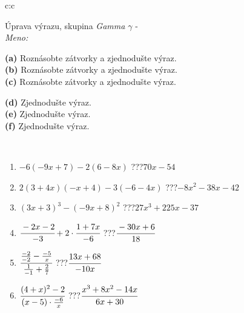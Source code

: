 \documentclass[10pt]{report}
\begin{document}
\newpage
\thispagestyle{empty}
\begin{tabular}{c:c}
\begin{minipage}[c][104.5mm][t]{0.5\linewidth}
\begin{center}
\vspace{7mm}
{\huge Úprava výrazu, skupina \textit{Gamma $\gamma$} -}\\[5mm]
\textit{Meno:}\phantom{xxxxxxxxxxxxxxxxxxxxxxxxxxxxxxxxxxxxxxxxxxxxxxxxxxxxxxxxxxxxxxxxx}\\[5mm]
\begin{minipage}{0.95\linewidth}
\begin{center}
{\small \begin{minipage}{0.6\textwidth}
\textbf{(a)} Roznásobte zátvorky a zjednodušte výraz. \\[1mm]
\textbf{(b)} Roznásobte zátvorky a zjednodušte výraz. \\[1mm]
\textbf{(c)} Roznásobte zátvorky a zjednodušte výraz.
\end{minipage} \begin{minipage}{0.39\textwidth}
\textbf{(d)} Zjednodušte výraz. \\[1mm]
\textbf{(e)} Zjednodušte výraz. \\[1mm]
\textbf{(f)} Zjednodušte výraz.
\end{minipage}
}
\end{center}
\end{minipage}
\\[4mm]
\begin{minipage}{0.79\linewidth}
\begin{center}
\begin{varwidth}{\linewidth}
\begin{enumerate}
\normalsize
\item $-6(-9x+7)-2(6-8x)$\quad \dotfill\; ???\;\dotfill \quad $70x-54$
\item $2(3+4x)(-x+4)-3(-6-4x)$\quad \dotfill\; ???\;\dotfill \quad $-8x^2-38x-42$
\item $(3x+3)^3-(-9x+8)^2$\quad \dotfill\; ???\;\dotfill \quad $27x^3+225x-37$
\item $\cfrac{-2x-2}{-3}+2\cdot\cfrac{1+7x}{-6}$\quad \dotfill\; ???\;\dotfill \quad $\cfrac{-30x+6}{18}$
\item $\cfrac{\frac{-2}{-2}-\frac{-5}{x}}{\frac{1}{-1}+\frac{2}{7}}$\quad \dotfill\; ???\;\dotfill \quad $\cfrac{13x+68}{-10x}$
\item $\cfrac{(4+x)^2-2}{(x-5)\cdot\frac{-6}{x}}$\quad \dotfill\; ???\;\dotfill \quad $\cfrac{x^3+8x^2-14x}{6x+30}$

\end{enumerate}
\end{varwidth}
\end{center}
\end{minipage}
\end{center}
\end{minipage}
\end{tabular}
\end{document}
